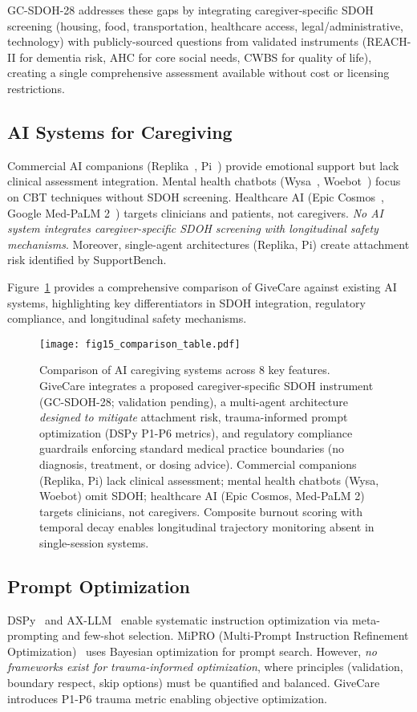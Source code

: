 \documentclass{article}
\begin{document}
GC-SDOH-28 addresses these gaps by integrating caregiver-specific SDOH screening (housing, food, transportation, healthcare access, legal/administrative, technology) with publicly-sourced questions from validated instruments (REACH-II for dementia risk, AHC for core social needs, CWBS for quality of life), creating a single comprehensive assessment available without cost or licensing restrictions.

%
\subsection{AI Systems for Caregiving}%
\label{subsec:AISystemsforCaregiving}%
Commercial AI companions (Replika~\cite{replika2024}, Pi~\cite{pi2024}) provide emotional support but lack clinical assessment integration. Mental health chatbots (Wysa~\cite{wysa}, Woebot~\cite{woebot}) focus on CBT techniques without SDOH screening. Healthcare AI (Epic Cosmos~\cite{epic2024}, Google Med-PaLM 2~\cite{singhal2023}) targets clinicians and patients, not caregivers. \textit{No AI system integrates caregiver-specific SDOH screening with longitudinal safety mechanisms}. Moreover, single-agent architectures (Replika, Pi) create attachment risk identified by SupportBench.

Figure~\ref{fig:comparison} provides a comprehensive comparison of GiveCare against existing AI systems, highlighting key differentiators in SDOH integration, regulatory compliance, and longitudinal safety mechanisms.

\begin{figure}[htbp]
\centering
\texttt{[image: fig15\_comparison\_table.pdf]}
\caption{Comparison of AI caregiving systems across 8 key features. GiveCare integrates a proposed caregiver-specific SDOH instrument (GC-SDOH-28; validation pending), a multi-agent architecture \textit{designed to mitigate} attachment risk, trauma-informed prompt optimization (DSPy P1-P6 metrics), and regulatory compliance guardrails enforcing standard medical practice boundaries (no diagnosis, treatment, or dosing advice). Commercial companions (Replika, Pi) lack clinical assessment; mental health chatbots (Wysa, Woebot) omit SDOH; healthcare AI (Epic Cosmos, Med-PaLM 2) targets clinicians, not caregivers. Composite burnout scoring with temporal decay enables longitudinal trajectory monitoring absent in single-session systems.}
\label{fig:comparison}
\end{figure}

%
\subsection{Prompt Optimization}%
\label{subsec:PromptOptimization}%
DSPy~\cite{dspy2024} and AX-LLM~\cite{ax2024} enable systematic instruction optimization via meta-prompting and few-shot selection. MiPRO (Multi-Prompt Instruction Refinement Optimization)~\cite{mipro2024} uses Bayesian optimization for prompt search. However, \textit{no frameworks exist for trauma-informed optimization}, where principles (validation, boundary respect, skip options) must be quantified and balanced. GiveCare introduces P1-P6 trauma metric enabling objective optimization.
\end{document}
